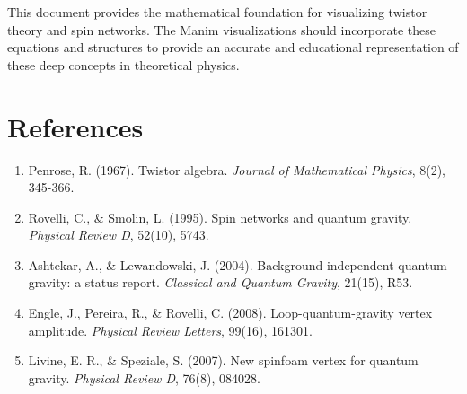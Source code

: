 \documentclass[12pt,a4paper]{article}
\begin{document}
This document provides the mathematical foundation for visualizing twistor theory and spin networks. The Manim visualizations should incorporate these equations and structures to provide an accurate and educational representation of these deep concepts in theoretical physics.

\section{References}

\begin{enumerate}
    \item Penrose, R. (1967). Twistor algebra. \textit{Journal of Mathematical Physics}, 8(2), 345-366.
    \item Rovelli, C., \& Smolin, L. (1995). Spin networks and quantum gravity. \textit{Physical Review D}, 52(10), 5743.
    \item Ashtekar, A., \& Lewandowski, J. (2004). Background independent quantum gravity: a status report. \textit{Classical and Quantum Gravity}, 21(15), R53.
    \item Engle, J., Pereira, R., \& Rovelli, C. (2008). Loop-quantum-gravity vertex amplitude. \textit{Physical Review Letters}, 99(16), 161301.
    \item Livine, E. R., \& Speziale, S. (2007). New spinfoam vertex for quantum gravity. \textit{Physical Review D}, 76(8), 084028.
\end{enumerate}
\end{document}
